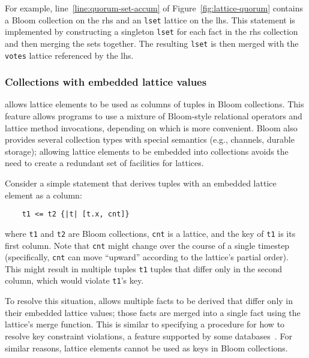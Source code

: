 For example, line~\ref{line:quorum-set-accum} of Figure~\ref{fig:lattice-quorum}
contains a Bloom collection on the rhs and an \texttt{lset} lattice on the
lhs. This statement is implemented by constructing a singleton \texttt{lset} for
each fact in the rhs collection and then merging the sets together. The
resulting \texttt{lset} is then merged with the \texttt{votes} lattice
referenced by the lhs.

\subsubsection{Collections with embedded lattice values}
\label{sec:lattice-embedding}
\lang allows lattice elements to be used as columns of tuples in Bloom
collections. This feature allows \lang programs to use a mixture of Bloom-style
relational operators and lattice method invocations, depending on which is more
convenient. Bloom also provides several collection types with special semantics
(e.g., channels, durable storage); allowing lattice elements to be embedded into
collections avoids the need to create a redundant set of facilities for
lattices.

Consider a simple \lang statement that derives tuples with an embedded lattice
element as a column:
\begin{verbatim}
    t1 <= t2 {|t| [t.x, cnt]}
\end{verbatim}
where \texttt{t1} and \texttt{t2} are Bloom collections, \texttt{cnt} is a
lattice, and the key of \texttt{t1} is its first column. Note that
\texttt{cnt} might change over the course of a single timestep (specifically,
\texttt{cnt} can move ``upward'' according to the lattice's partial
order). This might result in multiple tuples \texttt{t1} tuples that differ only
in the second column, which would violate \texttt{t1}'s key.

To resolve this situation, \lang allows multiple facts to be derived that differ
only in their embedded lattice values; those facts are merged into a single fact
using the lattice's merge function. This is similar to specifying a procedure
for how to resolve key constraint violations, a feature supported by some
databases~\cite{oracle-conflict,sqlite-on-conflict}. For similar reasons,
lattice elements cannot be used as keys in Bloom collections.%

